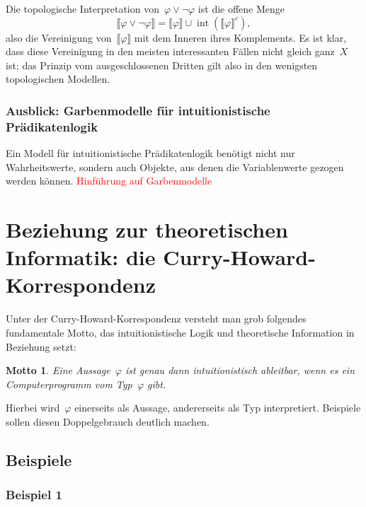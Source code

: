 \documentclass[a4paper,ngerman,12pt]{scrartcl}
\theoremstyle{definition}
\theoremstyle{plain}
\newtheorem{motto}[defn]{Motto}
\theoremstyle{remark}
\newcommand{\brak}[1]{\llbracket {#1} \rrbracket}
\DeclareMathOperator{\interior}{int}
\renewcommand{\_}{\mathpunct{.}\,}
\newcommand{\?}{\,{:}\,}
\newcommand{\XXX}[1]{\textcolor{red}{#1}}
\begin{document}
Die topologische Interpretation von~$\varphi \vee \neg\varphi$ ist die offene
Menge
\[ \brak{\varphi \vee \neg\varphi} = \brak{\varphi} \cup \interior
(\brak{\varphi}^c), \]
also die Vereinigung von~$\brak{\varphi}$ mit dem Inneren ihres Komplements. Es
ist klar, dass diese Vereinigung in den meisten interessanten Fällen nicht
gleich ganz~$X$ ist; das Prinzip vom ausgeschlossenen Dritten gilt also in den
wenigsten topologischen Modellen.



\subsubsection*{Ausblick: Garbenmodelle für intuitionistische Prädikatenlogik}


Ein Modell für intuitionistische Prädikatenlogik benötigt nicht nur
Wahrheitswerte, sondern auch Objekte, aus denen die Variablenwerte gezogen
werden können. \XXX{Hinführung auf Garbenmodelle}


\section[Beziehung zur theoretischen Informatik: die
Curry-Howard-Korrespondenz]{Beziehung zur theoretischen Informatik: \newline die
Curry-Howard-Korrespondenz}

Unter der Curry-Howard-Korrespondenz versteht man grob folgendes fundamentale
Motto, das intuitionistische Logik und theoretische Information in Beziehung
setzt:

\begin{motto}Eine Aussage~$\varphi$ ist genau dann intuitionistisch ableitbar,
wenn es ein Computerprogramm vom Typ~$\varphi$ gibt.\end{motto}

Hierbei wird~$\varphi$ einerseits als Aussage, andererseits als Typ
interpretiert. Beispiele sollen diesen Doppelgebrauch deutlich machen.


\subsection{Beispiele}

\subsubsection*{Beispiel 1}
\end{document}
